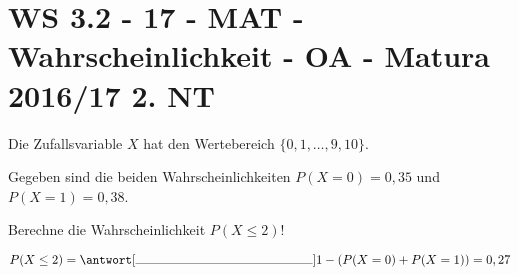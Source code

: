 \section{WS 3.2 - 17 - MAT - Wahrscheinlichkeit - OA - Matura 2016/17 2. NT}

\begin{beispiel}[WS 3.2]{1} %
Die Zufallsvariable $X$ hat den Wertebereich $\{0, 1, \ldots, 9, 10\}$.

Gegeben sind die beiden Wahrscheinlichkeiten $P(X=0)=0,35$ und \mbox{$P(X=1)=0,38$}.\leer

Berechne die Wahrscheinlichkeit $P(X\leq 2)$!\leer

$P(X\leq 2)=\antwort[\rule{5cm}{0.3pt}]{1-(P(X=0)+P(X=1))=0,27}$
\end{beispiel}